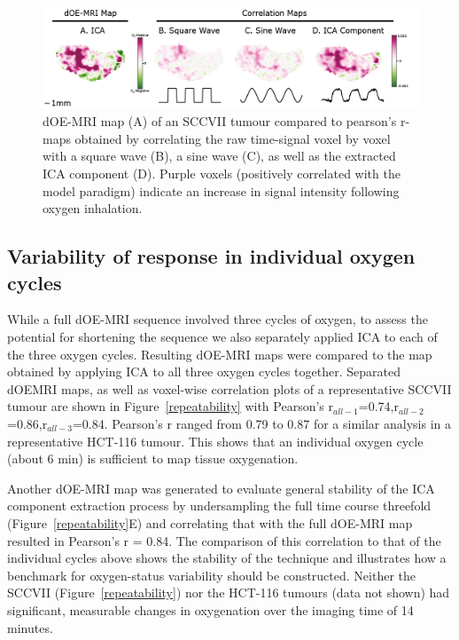\begin{figure}[htbp]
   \centering
   \includegraphics[width=\textwidth]{oemri/oemri-images/oemri_correlation.png} %
   \caption{dOE-MRI map (A) of an SCCVII tumour compared to pearson's r-maps obtained by correlating the raw time-signal voxel by voxel with a square wave (B), a sine wave (C), as well as the extracted ICA component (D).
Purple voxels (positively correlated with the model paradigm) indicate an increase in signal intensity following oxygen inhalation.}
   \label{correlation}
\end{figure}

\subsection{Variability of response in individual oxygen cycles}

While a full dOE-MRI sequence involved three cycles of oxygen, to assess the potential for shortening the sequence we also separately applied ICA to each of the three oxygen cycles.
Resulting dOE-MRI maps were compared to the map obtained by applying ICA to all three oxygen cycles together.
Separated dOEMRI maps, as well as voxel-wise correlation plots of a representative SCCVII tumour are shown in Figure~\ref{repeatability} with Pearson's r$_{all-1}$=0.74,r$_{all-2}$=0.86,r$_{all-3}$=0.84.
Pearson's r ranged from 0.79 to 0.87 for a similar analysis in a representative HCT-116 tumour.
This shows that an individual oxygen cycle (about 6 min) is sufficient to map tissue oxygenation.

Another dOE-MRI map was generated to evaluate general stability of the ICA component extraction process by undersampling the full time course threefold (Figure~\ref{repeatability}E) and correlating that with the full dOE-MRI map resulted in Pearson's r = 0.84.
The comparison of this correlation to that of the individual cycles above shows the stability of the technique and illustrates how a benchmark for oxygen-status variability should be constructed.
Neither the SCCVII (Figure~\ref{repeatability}) nor the HCT-116 tumours (data not shown) had significant, measurable changes in oxygenation over the imaging time of 14 minutes.



